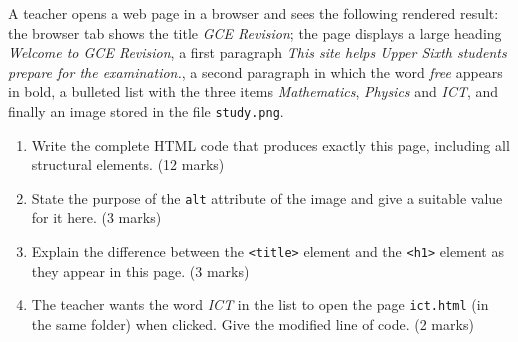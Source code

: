 \documentclass[11pt]{article}
\begin{document}
\begin{exercice}
A teacher opens a web page in a browser and sees the following rendered result: the browser tab shows the title \emph{GCE Revision}; the page displays a large heading \emph{Welcome to GCE Revision}, a first paragraph \emph{This site helps Upper Sixth students prepare for the examination.}, a second paragraph in which the word \emph{free} appears in bold, a bulleted list with the three items \emph{Mathematics}, \emph{Physics} and \emph{ICT}, and finally an image stored in the file \texttt{study.png}.
\begin{enumerate}
\item Write the complete HTML code that produces exactly this page, including all structural elements. \hfill (12 marks)
\item State the purpose of the \texttt{alt} attribute of the image and give a suitable value for it here. \hfill (3 marks)
\item Explain the difference between the \texttt{<title>} element and the \texttt{<h1>} element as they appear in this page. \hfill (3 marks)
\item The teacher wants the word \emph{ICT} in the list to open the page \texttt{ict.html} (in the same folder) when clicked. Give the modified line of code. \hfill (2 marks)
\end{enumerate}
\end{exercice}
\end{document}
